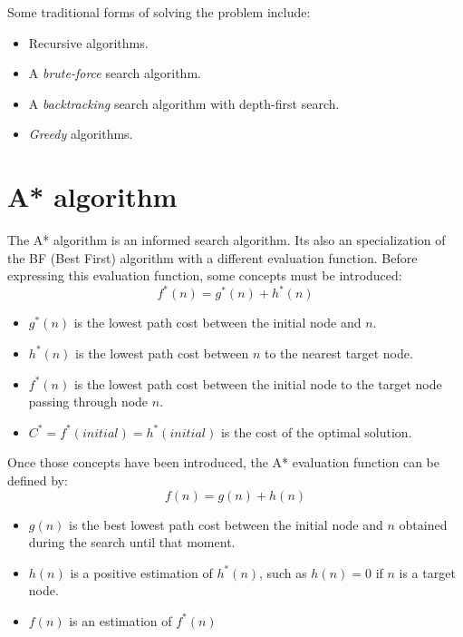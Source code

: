 \documentclass[11pt]{llncs}
\begin{document}
Some traditional forms of solving the problem include:
\begin{itemize}
    \item Recursive algorithms.
    \item A \textit{brute-force} search algorithm.
    \item A \textit{backtracking} search algorithm with depth-first search.
    \item \textit{Greedy} algorithms.
\end{itemize}
\section{A* algorithm}\label{astar_alg}
The A* algorithm \cite{inteligencia_artificial,artificial_intelligence} is an informed search algorithm. Its also an specialization of the BF (Best First) algorithm with a different evaluation function. Before expressing this evaluation function, some concepts must be introduced:
\[f^{*}(n) = g^{*}(n) + h^{*}(n)\]
\begin{itemize}
    \item $g^{*}(n)$ is the lowest path cost between the initial node and $n$.
    \item $h^{*}(n)$ is the lowest path cost between $n$ to the nearest target node.
    \item $f^{*}(n)$ is the lowest path cost between the initial node to the target node passing through node $n$. 
    \item $C^{*} = f^{*}(initial) = h^{*}(initial)$ is the cost of the optimal solution. 
\end{itemize}

Once those concepts have been introduced, the A* evaluation function can be defined by:
\[f(n) = g(n) + h(n)\]
\begin{itemize}
    \item $g(n)$ is the best lowest path cost between the initial node and $n$ obtained during the search until that moment.
    \item $h(n)$ is a positive estimation of $h^{*}(n)$, such as $h(n) = 0$ if $n$ is a target node.
    \item $f(n)$ is an estimation of $f^{*}(n)$
\end{itemize}
\end{document}
